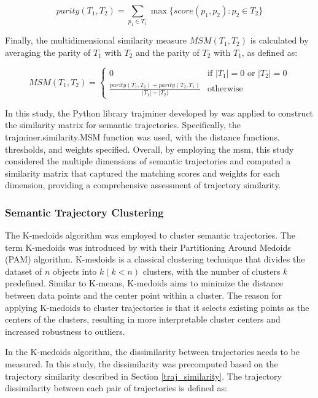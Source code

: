 \documentclass{article}
\theoremstyle{definition}
\theoremstyle{remark}
\begin{document}
\begin{equation} \label{eq:parity}
    parity(T_{1},T_{2}) = \sum_{p_{1}\in T_{1}}\max\{score(p_{1},p_{2}) : p_{2} \in T_{2}\}
\end{equation}

Finally, the multidimensional similarity measure $MSM(T_{1},T_{2})$ is calculated by averaging the parity of $T_{1}$ with $T_{2}$ and the parity of $T_{2}$ with $T_{1}$, as defined as:

\begin{equation} \label{eq:msm}
    MSM(T_{1},T_{2}) = \begin{cases}
    0 & \text{if } |T_{1}| = 0 \text{ or } |T_{2}| = 0 \\
    \frac{parity(T_{1},T_{2}) + parity(T_{2},T_{1})}{|T_{1}|+|T_{2}|} & \text{otherwise}
    \end{cases}
\end{equation}

In this study, the Python library trajminer developed by \cite{petry_trajminer_2019} was applied to construct the similarity matrix for semantic trajectories. Specifically, the trajminer.similarity.MSM function was used, with the distance functions, thresholds, and weights specified. Overall, by employing the \acrshort{msm}, this study considered the multiple dimensions of semantic trajectories and computed a similarity matrix that captured the matching scores and weights for each dimension, providing a comprehensive assessment of trajectory similarity.


\subsubsection{Semantic Trajectory Clustering}
The K-medoids algorithm was employed to cluster semantic trajectories. The term K-medoids was introduced by \cite{kaufman_partitioning_1990} with their Partitioning Around Medoids (PAM) algorithm. K-medoids is a classical clustering technique that divides the dataset of $n$ objects into $k (k<n)$ clusters, with the number of clusters $k$ predefined. Similar to K-means, K-medoids aims to minimize the distance between data points and the center point within a cluster. The reason for applying K-medoids to cluster trajectories is that it selects existing points as the centers of the clusters, resulting in more interpretable cluster centers and increased robustness to outliers.

In the K-medoids algorithm, the dissimilarity between trajectories needs to be measured. In this study, the dissimilarity was precomputed based on the trajectory similarity described in Section \ref{traj_similarity}. The trajectory dissimilarity between each pair of trajectories is defined as:
\end{document}
